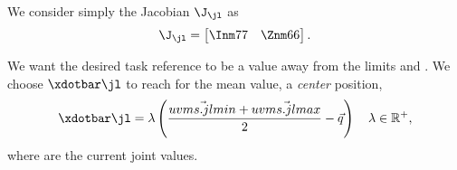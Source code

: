 \begin{parts}
		\begin{solutionorbox}
			We consider simply the Jacobian $\J_{\jl}$ as
			\[
				\J_{\jl} = \begin{bmatrix}
					\Inm77\quad
					\Znm66
				\end{bmatrix}
				\mathrm{.}
			\]

			We want the desired task reference to be a value away
			from the limits  and .
			We choose $\xdotbar\jl$ to reach for the mean value,
			a \emph{center} position,
			\[
				\xdotbar\jl =
				\lambda\left(\frac{\vec{uvms.jlmin} +
					\vec{uvms.jlmax}}2 -
					\vec{q}
				\right)\quad
				\lambda\in\mathbb{R}^+
				\mathrm{,}
			\]
			where  are the current joint values.
		\end{solutionorbox}
	\end{parts}

